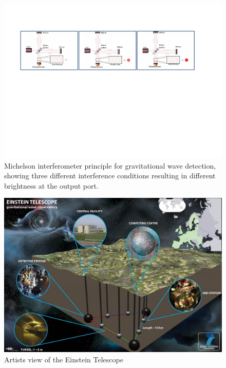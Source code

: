 {\begin{figure}[H]
		\includegraphics[width=\textwidth]{Sec_Introduction/GWdetection.pdf}
	\caption{Michelson interferometer principle for gravitational wave detection, showing three different interference conditions resulting in different brightness at the output port.}
	\label{fig:GWdetection}
\end{figure}
}


\begin{figure}[!h]
	\centering	\includegraphics[width=1.00\textwidth]{Sec_Introduction/ET_artists_view.jpg}
	\caption{Artists view of the Einstein Telescope}
	\label{fig:ET_artists_view}
\end{figure}


